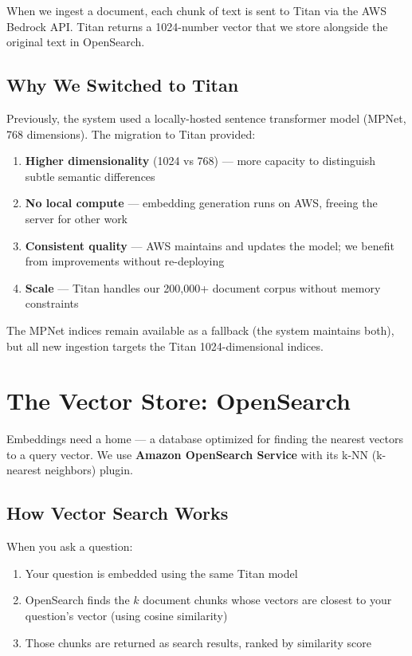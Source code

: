 \documentclass[11pt,letterpaper]{article}
\begin{document}
When we ingest a document, each chunk of text is sent to Titan via the
AWS Bedrock API. Titan returns a 1024-number vector that we store
alongside the original text in OpenSearch.

\subsection{Why We Switched to Titan}

Previously, the system used a locally-hosted sentence transformer model
(MPNet, 768 dimensions). The migration to Titan provided:

\begin{enumerate}[nosep]
    \item \textbf{Higher dimensionality} (1024 vs 768) — more capacity
    to distinguish subtle semantic differences
    \item \textbf{No local compute} — embedding generation runs on AWS,
    freeing the server for other work
    \item \textbf{Consistent quality} — AWS maintains and updates the
    model; we benefit from improvements without re-deploying
    \item \textbf{Scale} — Titan handles our 200,000+ document corpus
    without memory constraints
\end{enumerate}

The MPNet indices remain available as a fallback (the system maintains
both), but all new ingestion targets the Titan 1024-dimensional indices.

\section{The Vector Store: OpenSearch}

Embeddings need a home — a database optimized for finding the nearest
vectors to a query vector. We use \textbf{Amazon OpenSearch Service}
with its k-NN (k-nearest neighbors) plugin.

\subsection{How Vector Search Works}

When you ask a question:
\begin{enumerate}[nosep]
    \item Your question is embedded using the same Titan model
    \item OpenSearch finds the $k$ document chunks whose vectors are
    closest to your question's vector (using cosine similarity)
    \item Those chunks are returned as search results, ranked by
    similarity score
\end{enumerate}
\end{document}

